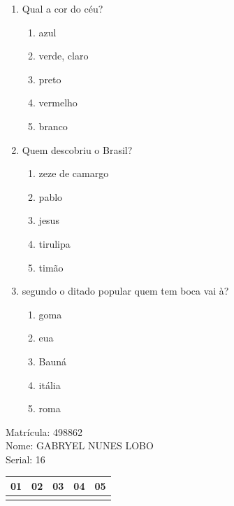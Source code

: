 \documentclass[10pt,a4paper,twocolumn]{report}
\begin{document}
 \begin{enumerate} 
    \item  Qual a cor do céu?





    \begin{enumerate}
    \item  azul

\item  verde, claro

\item  preto

\item  vermelho

\item  branco


    \end{enumerate} 
    \item  Quem descobriu o Brasil?





    \begin{enumerate}
    \item  zeze de camargo

\item  pablo

\item  jesus

\item  tirulipa

\item  timão


    \end{enumerate} 
    \item  segundo o ditado popular quem tem boca vai à?





    \begin{enumerate}
    \item  goma

\item  eua

\item  Bauná

\item  itália

\item  roma


    \end{enumerate}\end{enumerate} 
Matrícula: 498862\\ Nome: GABRYEL NUNES LOBO \\ Serial: 16\\
\begin{tabular}{|l|l|l|l|l|}\hline
01  &02  &03  &04  &05 \\ \hline 
 & & & & \\ \hline 
\end{tabular}
 \cleardoublepage 
\end{document}
